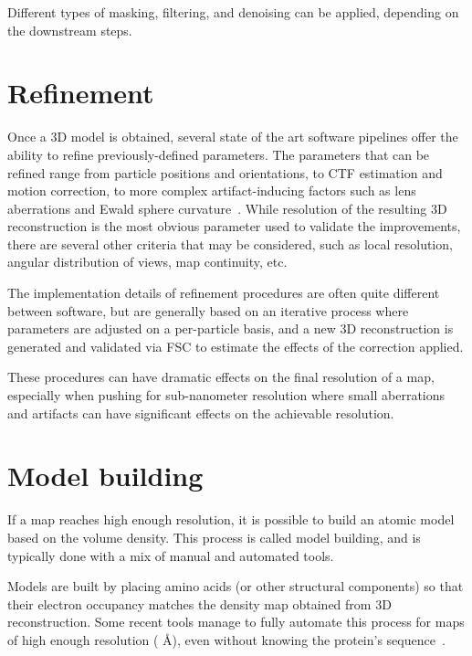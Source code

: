 Different types of masking, filtering, and denoising can be applied, depending on the downstream steps.


\section{Refinement}\label{em_refinement}
Once a 3D model is obtained, several state of the art software pipelines offer the ability to refine previously-defined parameters.
The parameters that can be refined range from particle positions and orientations, to CTF estimation and motion correction, to more complex artifact-inducing factors such as lens aberrations and Ewald sphere curvature~\cite{tegunovMultiparticleCryoEMRefinement2021,punjaniCryoSPARCAlgorithmsRapid2017,scheresRELIONImplementationBayesian2012}.
While resolution of the resulting 3D reconstruction is the most obvious parameter used to validate the improvements, there are several other criteria that may be considered, such as local resolution, angular distribution of views, map continuity, etc.

The implementation details of refinement procedures are often quite different between software, but are generally based on an iterative process where parameters are adjusted on a per-particle basis, and a new 3D reconstruction is generated and validated via FSC to estimate the effects of the correction applied.

These procedures can have dramatic effects on the final resolution of a map, especially when pushing for sub-nanometer resolution where small aberrations and artifacts can have significant effects on the achievable resolution.

\section{Model building}

If a map reaches high enough resolution, it is possible to build an atomic model based on the volume density.
This process is called model building, and is typically done with a mix of manual and automated tools.

Models are built by placing amino acids (or other structural components) so that their electron occupancy matches the density map obtained from 3D reconstruction.
Some recent tools manage to fully automate this process for maps of high enough resolution ( Å), even without knowing the protein's sequence~\cite{jamaliAutomatedModelBuilding2024}.
